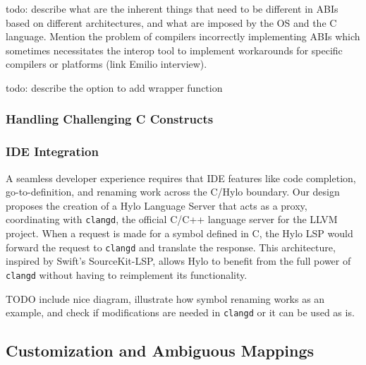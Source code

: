 todo: describe what are the inherent things that need to be different in ABIs based on different architectures, and what are imposed by the OS and the C language. Mention the problem of compilers incorrectly implementing ABIs which sometimes necessitates the interop tool to implement workarounds for specific compilers or platforms (link Emilio interview).

todo: describe the option to add wrapper function
\subsubsection{Handling Challenging C Constructs}


\subsubsection{IDE Integration}

A seamless developer experience requires that IDE features like code completion, go-to-definition, and renaming work across the C/Hylo boundary. Our design proposes the creation of a Hylo Language Server that acts as a proxy, coordinating with \texttt{clangd}, the official C/C++ language server for the LLVM project. When a request is made for a symbol defined in C, the Hylo LSP would forward the request to \texttt{clangd} and translate the response. This architecture, inspired by Swift's SourceKit-LSP, allows Hylo to benefit from the full power of \texttt{clangd} without having to reimplement its functionality.

TODO include nice diagram, illustrate how symbol renaming works as an example, and check if modifications are needed in \texttt{clangd} or it can be used as is.


\subsection{Customization and Ambiguous Mappings}

